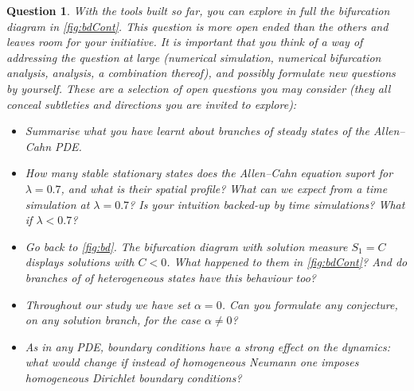 \documentclass[a4paper]{siamart220329}
\theoremstyle{plain}
\newtheorem{question}{Question}
\begin{document}
\begin{question}
  With the tools built so far, you can explore in full the bifurcation diagram in
  \cref{fig:bdCont}. This question is more open ended than the others and leaves room for
  your initiative. It is important that you think of a way of addressing the
  question at large
  (numerical simulation, numerical bifurcation analysis, analysis, a combination
  thereof), and possibly formulate new questions by yourself. These are a selection of
  open questions you may consider (they all conceal subtleties and directions you
  are invited to explore): 
  \begin{itemize}
    \item Summarise what you have learnt about branches of steady states
      of the Allen--Cahn PDE.
    \item How many \textit{stable} stationary states does the Allen--Cahn equation suport for $\lambda =
      0.7$, and what is their spatial profile? What can we expect from a time
      simulation at $\lambda = 0.7$? Is your intuition backed-up by time simulations?
      What if $\lambda < 0.7$?
    \item Go back to \cref{fig:bd}. The bifurcation diagram with solution measure
      $S_1 = C$ displays solutions with $C<0$. What happened to them in
      \cref{fig:bdCont}? And do branches of of heterogeneous states have this
      behaviour too?
    \item Throughout our study we have set $\alpha = 0$. Can you formulate any conjecture,
      on any solution branch, for the case $\alpha \neq 0$?
    \item As in any PDE, boundary conditions have a strong effect on the dynamics:
      what would change if instead of homogeneous Neumann one imposes homogeneous
      Dirichlet boundary conditions?
  \end{itemize}

\end{question}

% 
% 
\end{document}
